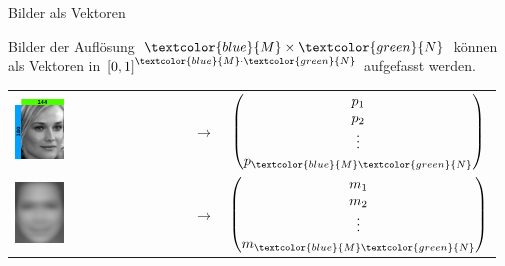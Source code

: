 \documentclass[10pt,aspectratio=169]{beamer}
\begin{document}
\begin{frame}[fragile]{Bilder als Vektoren}
	\begin{center}
		Bilder der Auflösung $\textcolor{blue}{M}\times\textcolor{green}{N}$ können als Vektoren in $\left[0,1\right]^{\textcolor{blue}{M}\cdot\textcolor{green}{N}}$ aufgefasst werden.
	\end{center}
	\begin{minipage}{0.45\textwidth}
		\begin{tabular}{m{2.0cm} m{0.5cm} c}
			\includegraphics[width=0.3\textwidth]{images/vectormatrix/ImageToVector} &
			$\longrightarrow$ &
			$\begin{pmatrix}
				p_{1} \\
				p_{2} \\
				\vdots \\
				p_{\textcolor{blue}{M}\textcolor{green}{N}} \\
			\end{pmatrix}$ \\
			\includegraphics[width=0.3\textwidth]{images/facespace/meanface} &
			$\longrightarrow$ &
			$\begin{pmatrix}
				m_{1} \\
				m_{2} \\
				\vdots \\
				m_{\textcolor{blue}{M}\textcolor{green}{N}} \\
			\end{pmatrix}$
		\end{tabular}
	\end{minipage}

\end{frame}
\end{document}
